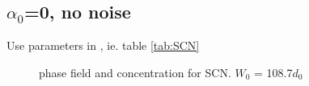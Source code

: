 \documentclass[a4paper,12pt]{article}
\begin{document}
\subsection{$\alpha_0$=0, no noise}
Use parameters in \cite{Echebarria2004}, ie. table \ref{tab:SCN}
\begin{figure}[!ht]
     \hfill
     \caption{phase field and concentration for SCN. $W_0$ = 108.7$d_0$}
     \label{fig:Ech}
   \end{figure}
\end{document}
